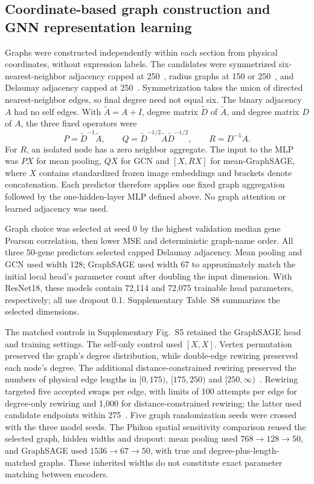 \subsection{Coordinate-based graph construction and GNN representation learning}
\label{sec:graph_methods}
Graphs were constructed independently within each section from physical coordinates, without expression labels. The candidates were symmetrized six-nearest-neighbor adjacency capped at 250~\um{}, radius graphs at 150 or 250~\um{}, and Delaunay adjacency capped at 250~\um{}. Symmetrization takes the union of directed nearest-neighbor edges, so final degree need not equal six. The binary adjacency $A$ had no self edges. With $\widetilde A=A+I$, degree matrix $\widetilde D$ of $\widetilde A$, and degree matrix $D$ of $A$, the three fixed operators were
\[
 P=\widetilde D^{-1}\widetilde A,\qquad
 Q=\widetilde D^{-1/2}\widetilde A\widetilde D^{-1/2},\qquad
 R=D^{-1}A.
\]
For $R$, an isolated node has a zero neighbor aggregate. The input to the MLP was $PX$ for mean pooling, $QX$ for GCN and $[X,RX]$ for mean-GraphSAGE, where $X$ contains standardized frozen image embeddings and brackets denote concatenation. Each predictor therefore applies one fixed graph aggregation followed by the one-hidden-layer MLP defined above. No graph attention or learned adjacency was used.

Graph choice was selected at seed 0 by the highest validation median gene Pearson correlation, then lower MSE and deterministic graph-name order. All three 50-gene predictors selected capped Delaunay adjacency. Mean pooling and GCN used width 128; GraphSAGE used width 67 to approximately match the initial local head's parameter count after doubling the input dimension. With ResNet18, these models contain 72,114 and 72,075 trainable head parameters, respectively; all use dropout 0.1. Supplementary Table~S8 summarizes the selected dimensions.

The matched controls in Supplementary Fig.~S5 retained the GraphSAGE head and training settings. The self-only control used $[X,X]$. Vertex permutation preserved the graph's degree distribution, while double-edge rewiring preserved each node's degree. The additional distance-constrained rewiring preserved the numbers of physical edge lengths in $[0,175)$, $[175,250)$ and $[250,\infty)$~\um{}. Rewiring targeted five accepted swaps per edge, with limits of 100 attempts per edge for degree-only rewiring and 1,000 for distance-constrained rewiring; the latter used candidate endpoints within 275~\um{}. Five graph randomization seeds were crossed with the three model seeds. The Phikon spatial sensitivity comparison reused the selected graph, hidden widths and dropout: mean pooling used $768\rightarrow128\rightarrow50$, and GraphSAGE used $1536\rightarrow67\rightarrow50$, with true and degree-plus-length-matched graphs. These inherited widths do not constitute exact parameter matching between encoders.

